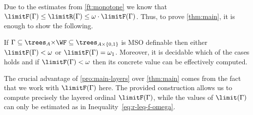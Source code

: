 Due to the estimates from \cref{ft:monotone}
we know that $\limitF(\Gamma)\leq \limitR(\Gamma) \leq \omega\cdot \limitF(\Gamma)$.
Thus, to prove \cref{thm:main}, it is enough to show the following.

\begin{prop}\label{pro:main-layers}
	If $\Gamma\subseteq \trees_A{\times} \WF\subseteq \trees_{A\times\{0,1\}}$ is MSO definable then either $\limitF(\Gamma)< \omega$ or $\limitF(\Gamma)=\omega_1$.
	Moreover, it is decidable which of the cases holds and if $\limitF(\Gamma)<\omega$ then its concrete value can be effectively computed.
\end{prop}

\noindent %
The crucial advantage of \cref{pro:main-layers} over \cref{thm:main} comes from the fact that we work with $\limitF(\Gamma)$ here.
The provided construction allows us to compute precisely the layered ordinal $\limitF(\Gamma)$, while the values of $\limit(\Gamma)$ can only be estimated as in Inequality~\eqref{eq:r-leq-f-omega}.

